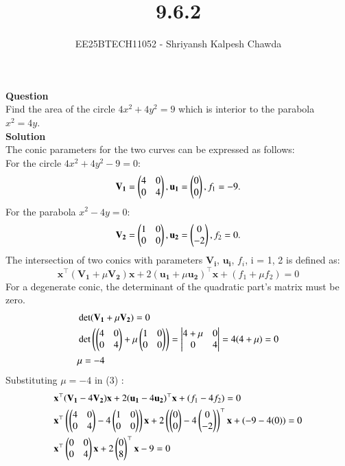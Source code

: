 \documentclass[article]{IEEEtran}
\begin{document}
	\title{9.6.2}
	\author{EE25BTECH11052 - Shriyansh Kalpesh Chawda}
	\maketitle
\textbf{Question}\\
Find the area of the circle $4x^{2} + 4y^{2} = 9$ which is interior to the parabola $x^{2} = 4y.$\\
\textbf{Solution}\\
The conic parameters for the two curves can be expressed as follows:\\
For the circle $4x^2 + 4y^2 - 9 = 0$:
\begin{align}
\mathbf{V_1} = \begin{pmatrix}4 & 0 \\ 0 & 4\end{pmatrix}, \mathbf{u_1} = \begin{pmatrix}0 \\ 0\end{pmatrix}, f_1 = -9. 
\end{align}
For the parabola $x^2 - 4y = 0$:
\begin{align}
\mathbf{V_2} = \begin{pmatrix}1 & 0 \\ 0 & 0\end{pmatrix}, \mathbf{u_2} = \begin{pmatrix}0 \\ -2\end{pmatrix}, f_2 = 0. 
\end{align}
The intersection of two conics with parameters $\mathbf{V_i}$, $\mathbf{u_i}$, $f_i$, i = 1, 2 is defined as:
\begin{equation}
	\mathbf{x}^\top(\mathbf{V_1} + \mu\mathbf{V_2})\mathbf{x} + 2(\mathbf{u_1} + \mu\mathbf{u_2})^\top\mathbf{x} + (f_1 + \mu f_2) = 0 
\end{equation}
For a degenerate conic, the determinant of the quadratic part's matrix must be zero.
\begin{align}
&\det(\mathbf{V_1} + \mu\mathbf{V_2}) = 0 \\
&\det\left(\begin{pmatrix}4 & 0 \\ 0 & 4\end{pmatrix} + \mu\begin{pmatrix}1 & 0 \\ 0 & 0\end{pmatrix}\right) =
\begin{vmatrix}
	4+\mu & 0 \\
	0 & 4
\end{vmatrix}
 = 4(4+\mu) = 0 \\
&\mu = -4
\end{align}
Substituting $\mu = -4$ in (3) :
\begin{align} 
&\mathbf{x}^\top( \mathbf{V_1} - 4\mathbf{V_2} )\mathbf{x} + 2( \mathbf{u_1} - 4\mathbf{u_2} )^\top\mathbf{x} + ( f_1 - 4f_2 ) = 0 \\
&\mathbf{x}^\top\left( \begin{pmatrix}4 & 0 \\ 0 & 4\end{pmatrix} - 4\begin{pmatrix}1 & 0 \\ 0 & 0\end{pmatrix} \right)\mathbf{x} + 2\left( \begin{pmatrix}0 \\ 0\end{pmatrix} - 4\begin{pmatrix}0 \\ -2\end{pmatrix} \right)^\top\mathbf{x} + ( -9 - 4(0) ) = 0 \\
&\mathbf{x}^\top \begin{pmatrix}0 & 0 \\ 0 & 4\end{pmatrix} \mathbf{x} + 2 \begin{pmatrix}0 \\ 8\end{pmatrix}^\top \mathbf{x} - 9 = 0 
\end{align}
\end{document}
